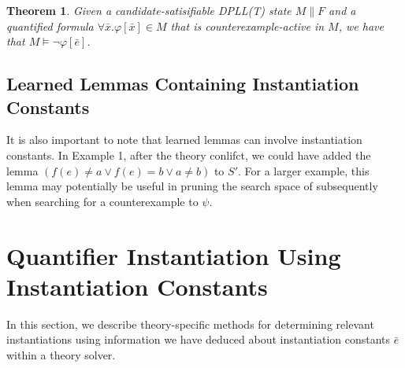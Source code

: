 \documentclass{llncs}
\newtheorem{thm}{Theorem}
\begin{document}
\begin{thm}
\label{thm:cerep}
Given a candidate-satisifiable DPLL(T) state $M \parallel F$ and a quantified formula $\forall \bar{x}. \varphi[ \bar{x} ] \in M$ that is counterexample-active in $M$, we have that $M \models \neg \varphi[\bar{e}]$.
\end{thm}

\subsection{Learned Lemmas Containing Instantiation Constants}

It is also important to note that learned lemmas can involve instantiation constants.
In Example 1, after the theory conlifct, we could have added the lemma $( f( e ) \neq a \vee f( e ) = b \vee a \neq b )$ to $S'$.
For a larger example, this lemma may potentially be useful in pruning the search space of subsequently when searching for a counterexample to $\psi$.

\begin{comment}
It is also important to note that learned lemmas can involve instantiation constants.
In this example, after the theory conlifct, we could have added the lemma $(\varphi_1 : ) ( f( e ) \neq a \vee f( e ) = b \vee a \neq b )$ to $S'$.
In this case, we may apply Decide to come to the state $( a = b ), \psi, (\bot^{\neg \psi}), (f( e ) \neq a)^d \parallel S' \cup \varphi$, where again all clauses are satisfied, and the solver answers SAT in the same manner.

However, note that the lemma $\varphi_1$ is only useful in contexts in which $\psi$ is asserted.
In other words, the solver should not be searching for values of counterexamples to quantified formulas $\psi$ when $\psi$ is not asserted.
We will see in Section~\ref{sec:implementation} a recommended implementation for which this concern is addressed.
[do this: do these lemmas pollute the DPLL(T) space?  When should we forget them?  Should we give them to minisat?]
[do this: examine elaborating lemmas involving instantiation constants as being lemmas involving universal statements, justify as well]
\end{comment}

\section{Quantifier Instantiation Using Instantiation Constants}

In this section, we describe theory-specific methods for determining relevant instantiations using information we have deduced about instantiation constants $\bar{e}$ within a theory solver.
\end{document}

